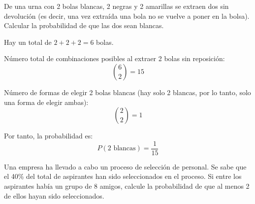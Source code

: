 \documentclass[addpoints,spanish, 12pt,a4paper]{exam}
\renewcommand*\half{.5}
\begin{document}
\begin{questions}



\question[1\half] De una urna con 2 bolas blancas, 2 negras y 2 amarillas se extraen dos sin devolución (es decir, una vez extraída una bola no se vuelve a poner en la bolsa). Calcular la probabilidad de que las dos sean blancas.

\begin{solution}
Hay un total de \( 2 + 2 + 2 = 6 \) bolas.

Número total de combinaciones posibles al extraer 2 bolas sin reposición:
\[
\binom{6}{2} = 15
\]

Número de formas de elegir 2 bolas blancas (hay solo 2 blancas, por lo tanto, solo una forma de elegir ambas):
\[
\binom{2}{2} = 1
\]

Por tanto, la probabilidad es:
\[
P(\text{2 blancas}) = \frac{1}{15}
\]
\end{solution}



\question[1\half] Una empresa ha llevado a cabo un proceso de selección de personal. Se sabe que el 40\% del total de aspirantes han sido seleccionados en el proceso. Si entre los aspirantes había un grupo de 8 amigos, calcule la probabilidad de que al menos 2 de ellos hayan sido seleccionados.


\end{questions}
\end{document}
